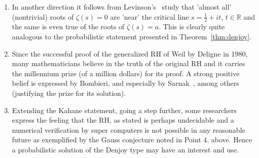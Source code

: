 \documentclass[11pt]{article}
\begin{document}
\begin{enumerate}
\item In another direction it follows from Levinson's~\cite{levinson} study that 'almost all' (nontrivial) roots of $\zeta(s) = 0$ are 'near' the critical line $s = \frac{1}{2} + it$, $t \in \mathbb{R}$ and the same is even true of the roots of $\zeta(s) = a$. This is clearly quite analogous to the probabilistic statement presented in Theorem~\ref{thm:denjoy}.

\item Since the successful proof of the generalized RH of Weil by Deligne in 1980, many mathematicians believe in the truth of the original RH and it carries the millennium prize (of a million dollars) for its proof. A strong positive belief is expressed by Bombieri, and especially by Sarnak~\cite{sarnak}, among others (justifying the prize for its solution).

\item Extending the Kahane statement, going a step further, some researchers express the feeling that the RH, as stated is perhaps undecidable and a numerical verification by super computers is not possible in any reasonable future as exemplified by the Gauss conjecture noted in Point 4. above. Hence a probabilistic solution of the Denjoy type may have an interest and use.
\end{enumerate}
\end{document}
